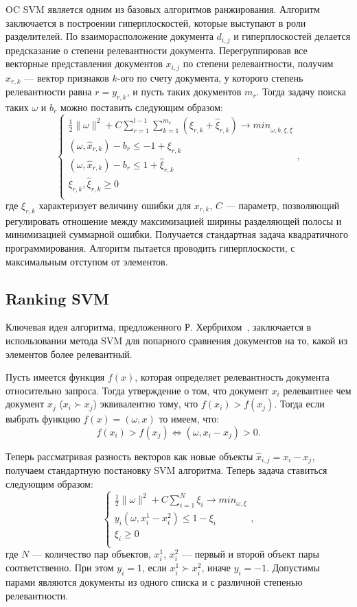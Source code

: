 OC SVM  является одним из базовых алгоритмов ранжирования. Алгоритм заключается в построении гиперплоскостей, которые выступают в роли разделителей. По взаиморасположение документа $d_{i,j}$ и гиперплоскостей делается предсказание о степени релевантности документа. 
Перегруппировав все векторные представления документов $x_{i,j}$ по степени релевантности, получим $\hat{x}_{r,k}$ --- вектор признаков $k$-ого по счету документа, у которого степень релевантности равна $r = y_{r,k}$, и пусть таких документов $m_{r}$. Тогда задачу поиска таких $\omega$ и $b_{r}$ можно поставить следующим образом:
\[
\begin{cases}
	\frac{1}{2}\| \omega \|^2+C  \displaystyle\sum_{r=1}^{l-1} \displaystyle\sum_{k=1}^{m_{r}} (\xi_{r, k}+\hat{\xi}_{r,k})\to min_{\omega, b, \xi, \hat{\xi}} \\
	(\omega, \hat{x}_{r,k}) - b_{r} \leq -1 + \xi_{r, k} \\
	(\omega, \hat{x}_{r,k}) - b_{r} \leq 1 + \hat{\xi}_{r,k} \\
	\xi_{r, k}, \hat{\xi}_{r,k} \geq 0 \\
\end{cases},
\]
где $\xi_{r, k}$ характеризует величину ошибки для $x_{r,k}$, $C$ --- параметр, позволяющий регулировать отношение между максимизацией ширины разделяющей полосы и минимизацией суммарной ошибки. Получается стандартная задача квадратичного программирования. Алгоритм пытается проводить гиперплоскости, с максимальным отступом от элементов.

\subsection{Ranking SVM}

Ключевая идея алгоритма, предложенного Р. Хербрихом~\cite{RankSVM}, заключается в использовании метода SVM для попарного сравнения документов на то, какой из элементов более релевантный. 

Пусть имеется функция $f(x)$, которая определяет релевантность документа относительно запроса. Тогда утверждение о том, что документ $x_{i}$ релевантнее чем документ $x_{j}$  ($x_{i} \succ x_{j}$)  эквивалентно тому, что $f(x_{i}) > f(x_{j})$. Тогда если выбрать функцию $f(x)=(\omega, x)$ то имеем, что:
\[
	f(x_{i}) > f(x_{j}) \iff (\omega, x_{i} - x_{j}) > 0.
\]

Теперь рассматривая разность векторов как новые объекты $\hat{x}_{i, j} = x_{i} - x_{j}$, получаем стандартную постановку SVM алгоритма. Теперь задача ставиться следующим образом:
\[
\begin{cases}
	\frac{1}{2}\| \omega \|^2+C  \displaystyle\sum_{i=1}^{N} \xi_{i}\to min_{\omega, \xi} \\
	y_{i}(\omega, x_{i}^1 - x_{i}^2) \leq 1 - \xi_{i} \\
	\xi_{i} \geq 0 \\
\end{cases},
\]
где $N$ --- количество пар объектов, $x_{i}^1$, $x_{i}^2$ --- первый и второй объект пары соответственно. При этом $y_{i} = 1$, если $x_{i}^1 \succ x_{i}^2$, иначе  $y_{i} = -1$. Допустимы парами являются документы из одного списка и с различной степенью релевантности.

